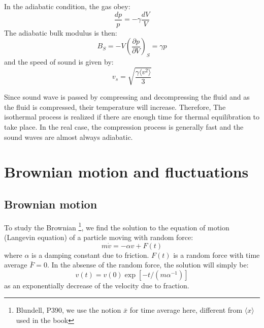 \documentclass{article}
\newcommand{\pfrac}[2]{\frac{\partial #1}{\partial #2}}
\begin{document}
In the adiabatic condition, the gas obey:
\begin{equation}
    \frac{dp}{p} = -\gamma \frac{dV}{V}
\end{equation}
The adiabatic bulk modulus is then:
\begin{equation}
    B_S = -V \left( \pfrac{p}{V} \right)_S = \gamma p
\end{equation}
and the speed of sound is given by:
\begin{equation}
    v_s = \sqrt{\frac{\gamma\langle v^2 \rangle }{3}}    
\end{equation}

Since sound wave is passed by compressing and decompressing the fluid and as the fluid is compressed, their 
temperature will increase. Therefore,
The isothermal process is realized if there are enough time for thermal equilibration to take place.  
In the real case, the compression process is generally fast and the sound waves are almost always adiabatic.

\section{Brownian motion and fluctuations}
\subsection*{Brownian motion}
To study the Brownian
\footnote{Blundell, P390, we use the notion $\bar{x}$ for time average here, 
different from $\langle x \rangle$ used in the book}, 
we find the solution to the equation of motion (Langevin equation)
of a particle moving with random force:
\begin{equation}
    m\dot{v} = -\alpha v + F(t) \label{brownian_eom}
\end{equation}
where $\alpha$ is a damping constant due to friction. $F(t)$ is a random force with 
time average $\bar{F} = 0$.
In the absense of the random force, the solution will simply be:
\begin{equation}
    v(t) = v(0)\exp[-t/(m\alpha^{-1})]
\end{equation}
as an exponentially decrease of the velocity due to fraction.
\end{document}
